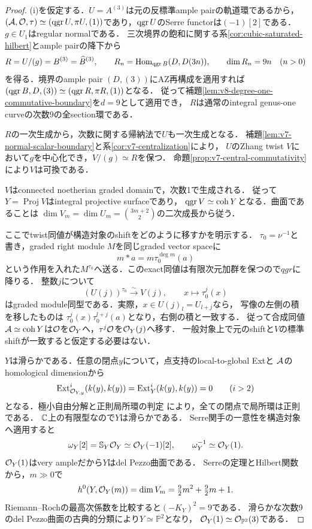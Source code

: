 \documentclass[11pt,a4paper]{ltjsarticle}
\begin{document}
\begin{proof}
(i)を仮定する．$U=A^{(3)}$は元の反標準ample pairの軌道環であるから，
$(\mathcal A,\mathcal O,\tau)\simeq(\operatorname{qgr} U,\pi U,(1))$であり，$\operatorname{qgr} U$のSerre functorは$(-1)[2]$である．
$g\in U_1$はregular normalである．
三次境界の飽和に関する系\ref{cor:cubic-saturated-hilbert}とample pairの降下から
\[
 R=U/(g)=B^{(3)}=\widehat B^{(3)},\qquad
 R_n=\operatorname{Hom}_{\operatorname{qgr} B}(D,D(3n)),\qquad\dim R_n=9n\quad(n>0)
\]
を得る．境界のample pair $(D,(3))$にAZ再構成を適用すれば
$(\operatorname{qgr} B,D,(3))\simeq(\operatorname{qgr} R,\pi R,(1))$となる．
従って補題\ref{lem:v8-degree-one-commutative-boundary}を$d=9$として適用でき，
$R$は通常のintegral genus-one curveの次数9の全section環である．

$R$の一次生成から，次数に関する帰納法で$U$も一次生成となる．
補題\ref{lem:v7-normal-scalar-boundary}と系\ref{cor:v7-centralization}により，
$U$のZhang twist $V$において$g$を中心化でき，$V/(g)\simeq R$を保つ．
命題\ref{prop:v7-central-commutativity}により$V$は可換である．

$V$はconnected noetherian graded domainで，次数1で生成される．
従って$Y=\operatorname{Proj}V$はintegral projective surfaceであり，
$\operatorname{qgr} V\simeq\operatorname{coh} Y$となる．曲面であることは
$\dim V_m=\dim U_m=\binom{3m+2}{2}$の二次成長から従う．

ここでtwist同値が構造対象のshiftをどのように移すかを明示する．
$\tau_0=\nu^{-1}$と書き，graded right module $M$を同じgraded vector spaceに
\[
 m*a=m\tau_0^{\deg m}(a)
\]
という作用を入れた$M^{\tau_0}$へ送る．このexact同値は有限次元加群を保つので$qgr$に降りる．
整数$j$について
\[
 (U(j))^{\tau_0}\xrightarrow{\sim}V(j),\qquad x\longmapsto\tau_0^j(x)
\]
はgraded module同型である．実際，$x\in U(j)_l=U_{l+j}$なら，
写像の左側の積を移したものは
$\tau_0^j(x)\tau_0^{l+j}(a)$となり，右側の積と一致する．
従って合成同値$\mathcal A\simeq\operatorname{coh} Y$は$\mathcal O$を$\mathcal O_Y$へ，$\tau^j\mathcal O$を$\mathcal O_Y(j)$へ移す．
一般対象上で元のshiftと$V$の標準shiftが一致すると仮定する必要はない．

$Y$は滑らかである．任意の閉点$y$について，点支持のlocal-to-global Extと
$\mathcal A$のhomological dimensionから
\[
 \operatorname{Ext}^i_{\mathcal O_{Y,y}}(k(y),k(y))
 =\operatorname{Ext}^i_Y(k(y),k(y))=0\qquad(i>2)
\]
となる．極小自由分解と正則局所環の判定
\cite[Tag 065U, Proposition 10.110.5]{Stacks}により，全ての閉点で局所環は正則である．
$\mathbb C$上の有限型なので$Y$は滑らかである．
Serre関手の一意性を構造対象へ適用すると
\[
 \omega_Y[2]=\mathbb S_Y\mathcal O_Y\simeq\mathcal O_Y(-1)[2],
 \qquad\omega_Y^{-1}\simeq\mathcal O_Y(1).
\]
$\mathcal O_Y(1)$はvery ampleだから$Y$はdel Pezzo曲面である．
Serreの定理とHilbert関数から，$m\gg0$で
\[
 h^0(Y,\mathcal O_Y(m))=\dim V_m=\tfrac92m^2+\tfrac92m+1.
\]
Riemann--Rochの最高次係数を比較すると$(-K_Y)^2=9$である．
滑らかな次数9のdel Pezzo曲面の古典的分類\cite[\S2.1, \S3.1.1]{DolgachevMartin}により$Y\simeq\mathbb P^2$となり，
$\mathcal O_Y(1)\simeq\mathcal O_{\mathbb P^2}(3)$である．


\end{proof}
\end{document}
